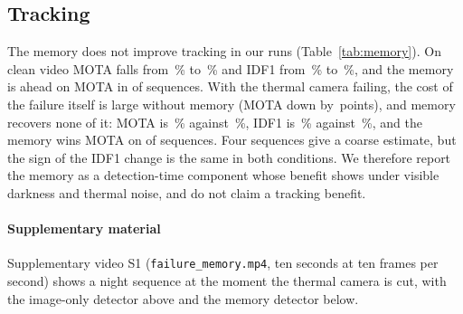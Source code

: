 \subsection{Tracking}
\label{sec:kaisttracking}
The memory does not improve tracking in our runs (Table~\ref{tab:memory}). On clean video MOTA falls from \trkCleanImageMota{}\,\% to \trkCleanMemoryMota{}\,\% and IDF1 from \trkCleanImageIdfOne{}\,\% to \trkCleanMemoryIdfOne{}\,\%, and the memory is ahead on MOTA in \trkCleanMemoryWinsMota{} of \trkSeqCount{} sequences. With the thermal camera failing, the cost of the failure itself is large without memory (MOTA down by \trkFaultCostImageMota{}\,points), and memory recovers none of it: MOTA is \trkThermalLostMemoryMota{}\,\% against \trkThermalLostImageMota{}\,\%, IDF1 is \trkThermalLostMemoryIdfOne{}\,\% against \trkThermalLostImageIdfOne{}\,\%, and the memory wins MOTA on \trkThermalLostMemoryWinsMota{} of \trkSeqCount{} sequences. Four sequences give a coarse estimate, but the sign of the IDF1 change is the same in both conditions. We therefore report the memory as a detection-time component whose benefit shows under visible darkness and thermal noise, and do not claim a tracking benefit.

\paragraph{Supplementary material}
Supplementary video S1 (\texttt{failure\_memory.mp4}, ten seconds at ten frames per second) shows a night sequence at the moment the thermal camera is cut, with the image-only detector above and the memory detector below.
